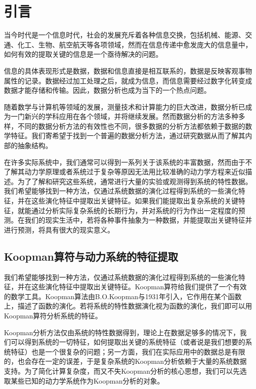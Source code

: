 \chapter{引言}

当今时代是一个信息时代，社会的发展充斥着各种信息交换，包括机械、能源、交通、化工、生物、航空航天等各项领域，然而在信息传递中愈发庞大的信息量中，如何有效的提取关键的信息是一个亟待解决的问题。

信息的具体表现形式是数据，数据和信息直接是相互联系的，数据是反映客观事物属性的记录。数据经过加工处理之后，就成为信息，而信息需要经过数字化转变成数据才能存储和传输。因此，数据分析也成为当下的一个热点问题。

随着数学与计算机等领域的发展，测量技术和计算能力的巨大改进，数据分析已成为一门新兴的学科应用在各个领域，并将继续发展。然而数据分析的方法多种多样，不同的数据分析方法的有效性也不同，很多数据的分析方法都依赖于数据的数学特征。我们寄希望于找到一个普遍的数据分析方法，通过研究数据从而了解其内部的抽象结构。

在许多实际系统中，我们通常可以得到一系列关于该系统的丰富数据，然而由于不了解其动力学原理或者系统过于复杂等原因无法用比较准确的动力学方程来近似描述。为了了解和研究这些系统，通常进行大量的实验或观测得到系统的特性数据。我们希望能够找到一种方法，仅通过系统数据的演化过程得到系统的一些演化特征，并在这些演化特征中提取出关键特征。如果我们能提取出复杂系统的关键特征，就能通过分析实际复杂系统的长期行为，并对系统的行为作出一定程度的预测。在我们的现实生活中，若将各种事件抽象为一种数据，并能提取出关键特征并进行预测，将具有很大的现实意义。

\section{Koopman算符与动力系统的特征提取}

我们希望能够找到一种方法，仅通过系统数据的演化过程得到系统的一些演化特征，并在这些演化特征中提取出关键特征。Koopman算符给我们提供了一个有效的数学工具。Koopman算法由B.O.Koopman与1931年引入，它作用在某个函数上，描述了函数的演化。若将系统的特性数据演化视为函数的演化，我们即可以用Koopman算符分析系统的特征。

Koopman分析方法仅由系统的特性数据得到，理论上在数据足够多的情况下，我们可以得到系统的一切特征，如何提取出关键的系统特征（或者说是我们想要的系统特征）也是一个很复杂的问题；另一方面，我们在实际应用中的数据总是有限的，也会存在一定的误差，于是复杂系统的Koopman分析依赖于大量的系统数据支持。为了简化计算复杂度，而又不失Koopman分析的核心思想，我们可以先选取某些已知的动力学系统作为Koopman分析的对象。


